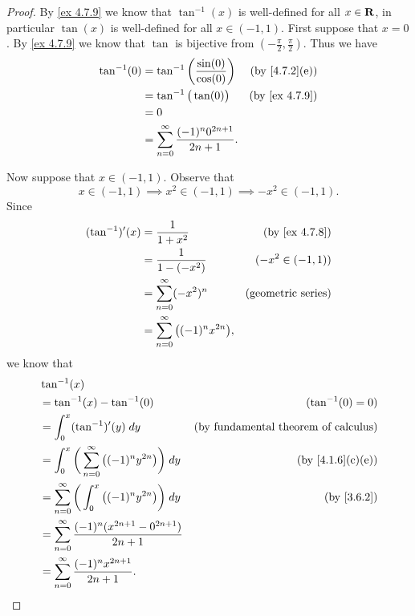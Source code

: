 \begin{proof}
  By \cref{ex 4.7.9} we know that \(\tan^{-1}(x)\) is well-defined for all \(x \in \mathbf{R}\), in particular \(\tan(x)\) is well-defined for all \(x \in (-1, 1)\).
  First suppose that \(x = 0\).
  By \cref{ex 4.7.9} we know that \(\tan\) is bijective from \((-\frac{\pi}{2}, \frac{\pi}{2})\).
  Thus we have
  \begin{align*}
    \tan^{-1}(0) & = \tan^{-1}\bigg(\frac{\sin(0)}{\cos(0)}\bigg)          & \text{(by \cref{4.7.2}(e))} \\
                 & = \tan^{-1}\big(\tan(0)\big)                            & \text{(by \cref{ex 4.7.9})} \\
                 & = 0                                                                                   \\
                 & = \sum_{n = 0}^\infty \frac{(-1)^n 0^{2n + 1}}{2n + 1}.
  \end{align*}

  Now suppose that \(x \in (-1, 1)\).
  Observe that
  \[
    x \in (-1, 1) \implies x^2 \in (-1, 1) \implies -x^2 \in (-1, 1).
  \]
  Since
  \begin{align*}
    (\tan^{-1})'(x) & = \frac{1}{1 + x^2}                            & \text{(by \cref{ex 4.7.8})} \\
                    & = \frac{1}{1 - (-x^2)}                         & (-x^2 \in (-1, 1))          \\
                    & = \sum_{n = 0}^\infty (-x^2)^n                 & \text{(geometric series)}   \\
                    & = \sum_{n = 0}^\infty \big((-1)^n x^{2n}\big),
  \end{align*}
  we know that
  \begin{align*}
     & \tan^{-1}(x)                                                                                                             \\
     & = \tan^{-1}(x) - \tan^{-1}(0)                                              & (\tan^{-1}(0) = 0)                          \\
     & = \int_0^x (\tan^{-1})'(y) \; dy                                           & \text{(by fundamental theorem of calculus)} \\
     & = \int_{0}^x \bigg(\sum_{n = 0}^\infty \big((-1)^n y^{2n}\big)\bigg) \; dy & \text{(by \cref{4.1.6}(c)(e))}              \\
     & = \sum_{n = 0}^\infty \bigg(\int_{0}^x \big((-1)^n y^{2n}\big)\bigg) \; dy & \text{(by \cref{3.6.2})}                    \\
     & = \sum_{n = 0}^\infty \frac{(-1)^n (x^{2n + 1} - 0^{2n + 1})}{2n + 1}                                                    \\
     & = \sum_{n = 0}^\infty \frac{(-1)^n x^{2n + 1}}{2n + 1}.
  \end{align*}


\end{proof}
